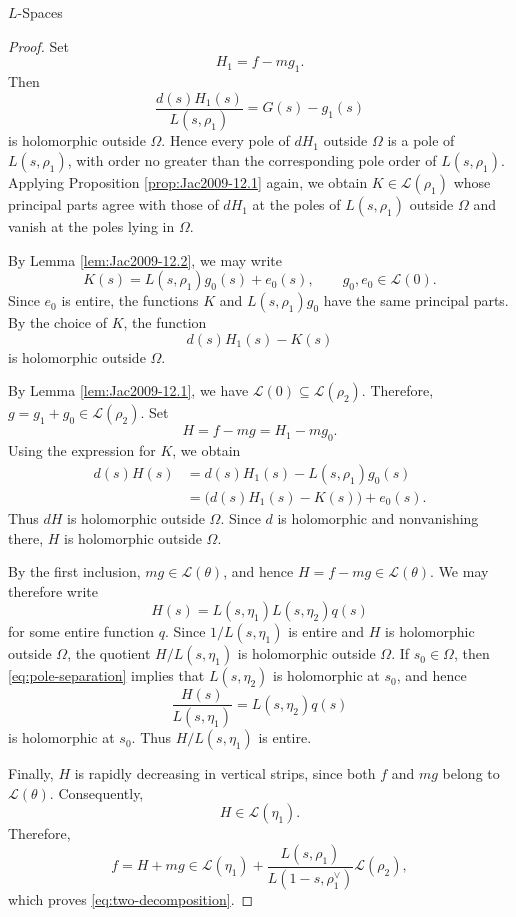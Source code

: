\documentclass[12pt,reqno]{amsart}
\numberwithin{equation}{section}%
\numberwithin{equation}{subsection}
\theoremstyle{definition}
\theoremstyle{remark}
\begin{document}
\begin{section}{\texorpdfstring{$L$}{L}-Spaces}
\begin{proof}
Set
\[
H_1=f-mg_1.
\]
Then
\[
\frac{d(s)H_1(s)}{L(s,\rho_1)}
=
G(s)-g_1(s)
\]
is holomorphic outside $\Omega$. Hence every pole of $dH_1$ outside
$\Omega$ is a pole of $L(s,\rho_1)$, with order no greater than the
corresponding pole order of $L(s,\rho_1)$. Applying Proposition
\ref{prop:Jac2009-12.1} again, we obtain
$K\in\mathcal{L}(\rho_1)$ whose principal parts agree with those of
$dH_1$ at the poles of $L(s,\rho_1)$ outside $\Omega$ and vanish at
the poles lying in $\Omega$.

By Lemma \ref{lem:Jac2009-12.2}, we may write
\[
K(s)=L(s,\rho_1)g_0(s)+e_0(s),
\qquad
g_0,e_0\in\mathcal{L}(0).
\]
Since $e_0$ is entire, the functions $K$ and
$L(s,\rho_1)g_0$ have the same principal parts. By the choice of
$K$, the function
\[
d(s)H_1(s)-K(s)
\]
is holomorphic outside $\Omega$.

By Lemma \ref{lem:Jac2009-12.1}, we have
$\mathcal{L}(0)\subseteq\mathcal{L}(\rho_2)$. Therefore, $g=g_1+g_0\in\mathcal{L}(\rho_2)$. Set
\[
H=f-mg=H_1-mg_0.
\]
Using the expression for $K$, we obtain
\[
\begin{aligned}
d(s)H(s)
&=
d(s)H_1(s)-L(s,\rho_1)g_0(s)\\
&=
\bigl(d(s)H_1(s)-K(s)\bigr)+e_0(s).
\end{aligned}
\]
Thus $dH$ is holomorphic outside $\Omega$. Since $d$ is holomorphic
and nonvanishing there, $H$ is holomorphic outside $\Omega$.

By the first inclusion, $mg\in\mathcal{L}(\theta)$, and hence
$H=f-mg\in\mathcal{L}(\theta)$. We may therefore write
\[
H(s)=L(s,\eta_1)L(s,\eta_2)q(s)
\]
for some entire function $q$. Since \(1/L(s,\eta_1)\) is entire and \(H\) is holomorphic outside
\(\Omega\), the quotient \(H/L(s,\eta_1)\) is holomorphic outside
\(\Omega\). If $s_0\in\Omega$, then
\eqref{eq:pole-separation} implies that $L(s,\eta_2)$ is holomorphic
at $s_0$, and hence
\[
\frac{H(s)}{L(s,\eta_1)}
=
L(s,\eta_2)q(s)
\]
is holomorphic at $s_0$. Thus $H/L(s,\eta_1)$ is entire.

Finally, $H$ is rapidly decreasing in vertical strips, since both
$f$ and $mg$ belong to $\mathcal{L}(\theta)$. Consequently,
\[
H\in\mathcal{L}(\eta_1).
\]
Therefore,
\[
f
=
H+mg
\in
\mathcal{L}(\eta_1)
+
\frac{L(s,\rho_1)}{L(1-s,\rho_1^\vee)}
\mathcal{L}(\rho_2),
\]
which proves \eqref{eq:two-decomposition}.
\end{proof}
    
\end{section}
\end{document}
